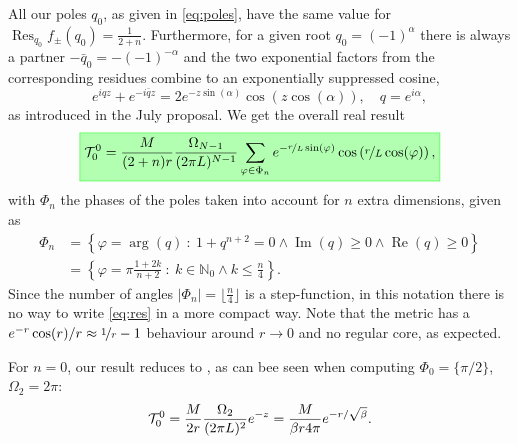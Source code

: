 \documentclass[10pt,a4paper]{article}
\newcommand{\highlight}[1]{%
   \fcolorbox{green}{green!30}{$\displaystyle#1$}%
}
\begin{document}
All our poles $q_0$, as given in \eqref{eq:poles}, have the same value for $\operatorname{Res}_{q_0} f_\pm(q_0) = \frac{1}{2+n}$.
Furthermore, for a given root $q_0 = (-1)^\alpha$ there is always a partner $-\bar q_0 = -(-1)^{-\alpha}$ and the
two exponential factors from the corresponding residues combine to an exponentially suppressed cosine,
\begin{equation}
e^{iqz} + e^{-i\bar{q}z} = 2e^{-z \sin(\alpha)} \cos(z \cos(\alpha)), \quad q=e^{i\alpha},
\end{equation}
as introduced in the July proposal. We get the overall real result
\begin{equation} \label{eq:res}
\highlight{
\C T^0_0 = \frac{M}{(2+n)r} \frac{\Omega_{N-1}}{(2\pi L)^{N-1}}
\sum_{\varphi \in \Phi_n} e^{-\nicefrac rL \sin(\varphi)} \cos\left( \nicefrac rL \cos(\varphi) \right),
}%
\end{equation}
with $\Phi_n$ the phases of the poles taken into account for $n$ extra dimensions, given as
\begin{align}
\Phi_n &= \left\{ \varphi=\arg(q)~:~1 + q^{n+2}=0 \wedge \operatorname{Im}(q) \geq 0 \wedge \operatorname{Re}(q) \geq 0 \right\}
\\
\label{eq:Phi}
&= \left\{ \varphi=\pi \frac{1 + 2k}{n+2}~:~k \in \mathbb{N}_0 \wedge k \leq \frac{n}{4}  \right\}.
\end{align}
Since the number of angles $|\Phi_n|=\lfloor \frac{n}{4} \rfloor$
is a step-function, in this notation there is no way to write \eqref{eq:res} in a more compact way. Note that the metric has
a $e^{-r}\cos(r)/r \approx \nicefrac 1r - 1$ behaviour around $r \to 0$ and no regular core, as expected.

For $n=0$, our result reduces to \cite{isi2013}, as can bee seen when computing $\Phi_0 = \{ \pi/2 \}$, $\Omega_2=2\pi$:
\begin{equation}
{\cal T}^0_0 = \frac{M}{2r} \frac{\Omega_2}{(2\pi L)^2} e^{-z}
= \frac{M}{\beta r 4\pi} e^{-r/\sqrt{\beta}}.
\end{equation}
\end{document}
